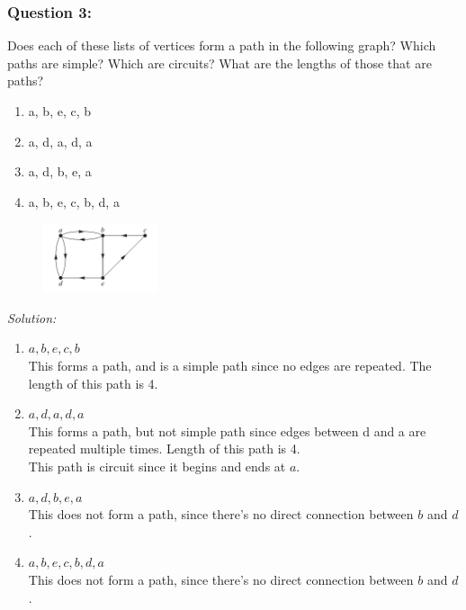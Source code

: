 \documentclass[a4paper]{article}
\begin{document}
	\subsubsection*{Question 3:}
	Does each of these lists of vertices form a path in the following graph? Which paths are simple? Which are circuits? What are the lengths of those that are paths?
	\begin{enumerate}[label=\alph*)]
		\item a, b, e, c, b
		\item a, d, a, d, a
		\item a, d, b, e, a
		\item a, b, e, c, b, d, a
	\end{enumerate}
	\begin{figure}[H]
		\centering
		\includegraphics[width=0.3\textwidth]{tut93.png}
	\end{figure}
	\textit{Solution:} \\
	\begin{enumerate}[label = \alph*)]
	    \item  
	    $a, b, e, c, b$ \\
        This forms a path, and is a simple path since no edges are repeated. The length of this path is 4.
	    \item 
	    $a, d, a, d, a$ \\
	    This forms a path, but not simple path since edges between d and a are repeated multiple times. Length of this path is 4.\\
	    This path is circuit since it begins and ends at $a$.
	    \item
	    $a, d, b, e, a$ \\
	    This does not form a path, since there's no direct connection between $b$ and $d$.
	    \item 
    	$a, b, e, c, b, d, a$ \\
	    This does not form a path, since there's no direct connection between $b$ and $d$.
	\end{enumerate}




\end{document}
